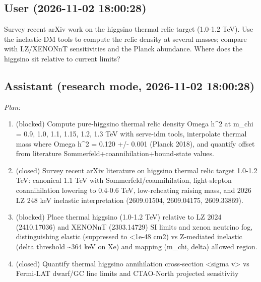 \documentclass[11pt,a4paper]{article}
\begin{document}
\subsection*{User \small(2026-11-02 18:00:28)}
Survey recent arXiv work on the higgsino thermal relic target (1.0-1.2 TeV). Use the inelastic-DM tools to compute the relic density at several masses; compare with LZ/XENONnT sensitivities and the Planck abundance. Where does the higgsino sit relative to current limits?

\subsection*{Assistant \small(research mode, 2026-11-02 18:00:28)}
\textit{Plan:}\begin{enumerate}
  \item (blocked) Compute pure-higgsino thermal relic density Omega h\textasciicircum{}2 at m\_chi = 0.9, 1.0, 1.1, 1.15, 1.2, 1.3 TeV with serve-idm tools, interpolate thermal mass where Omega h\textasciicircum{}2 = 0.120 +/- 0.001 (Planck 2018), and quantify offset from literature Sommerfeld+coannihilation+bound-state values.
  \item (closed) Survey recent arXiv literature on higgsino thermal relic target 1.0-1.2 TeV: canonical 1.1 TeV with Sommerfeld/coannihilation, light-slepton coannihilation lowering to 0.4-0.6 TeV, low-reheating raising mass, and 2026 LZ 248 keV inelastic interpretation (2609.01504, 2609.04175, 2609.33869).
  \item (blocked) Place thermal higgsino (1.0-1.2 TeV) relative to LZ 2024 (2410.17036) and XENONnT (2303.14729) SI limits and xenon neutrino fog, distinguishing elastic (suppressed to \textless{}1e-48 cm2) vs Z-mediated inelastic (delta threshold \textasciitilde{}364 keV on Xe) and mapping (m\_chi, delta) allowed region.
  \item (closed) Quantify thermal higgsino annihilation cross-section \textless{}sigma v\textgreater{} vs Fermi-LAT dwarf/GC line limits and CTAO-North projected sensitivity
\end{enumerate}
\end{document}
